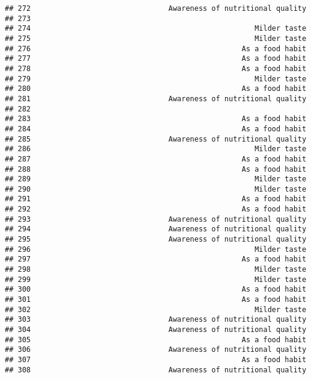\documentclass[
]{article}
\begin{document}
\begin{verbatim}
## 272                                Awareness of nutritional quality
## 273                                                                
## 274                                                    Milder taste
## 275                                                    Milder taste
## 276                                                 As a food habit
## 277                                                 As a food habit
## 278                                                 As a food habit
## 279                                                    Milder taste
## 280                                                 As a food habit
## 281                                Awareness of nutritional quality
## 282                                                                
## 283                                                 As a food habit
## 284                                                 As a food habit
## 285                                Awareness of nutritional quality
## 286                                                    Milder taste
## 287                                                 As a food habit
## 288                                                 As a food habit
## 289                                                    Milder taste
## 290                                                    Milder taste
## 291                                                 As a food habit
## 292                                                 As a food habit
## 293                                Awareness of nutritional quality
## 294                                Awareness of nutritional quality
## 295                                Awareness of nutritional quality
## 296                                                    Milder taste
## 297                                                 As a food habit
## 298                                                    Milder taste
## 299                                                    Milder taste
## 300                                                 As a food habit
## 301                                                 As a food habit
## 302                                                    Milder taste
## 303                                Awareness of nutritional quality
## 304                                Awareness of nutritional quality
## 305                                                 As a food habit
## 306                                Awareness of nutritional quality
## 307                                                 As a food habit
## 308                                Awareness of nutritional quality

\end{verbatim}
\end{document}

